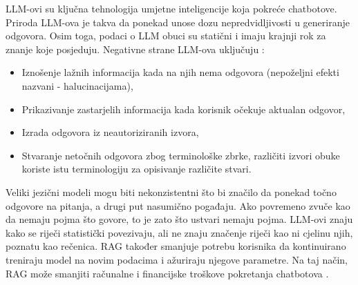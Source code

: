 \documentclass[]{foi}
\begin{document}
LLM-ovi su ključna tehnologija umjetne inteligencije koja pokreće chatbotove. Priroda LLM-ova je takva da ponekad unose dozu nepredvidljivosti
u generiranje odgovora. Osim toga, podaci o LLM obuci su statični i imaju krajnji rok za znanje koje posjeduju. Negativne strane LLM-ova uključuju \cite{awsRAG2025}:

\begin{itemize}
    \item Iznošenje lažnih informacija kada na njih nema odgovora (nepoželjni efekti nazvani - halucinacijama), 
    \item Prikazivanje zastarjelih informacija kada korisnik očekuje aktualan odgovor,
    \item Izrada odgovora iz neautoriziranih izvora,
    \item Stvaranje netočnih odgovora zbog terminološke zbrke, različiti izvori obuke koriste istu terminologiju za opisivanje različite stvari.
\end{itemize}

Veliki jezični modeli mogu biti nekonzistentni što bi značilo da ponekad točno odgovore na pitanja, a drugi put nasumično pogađaju. Ako povremeno zvuče kao da nemaju pojma što govore, 
to je zato što ustvari nemaju pojma. LLM-ovi znaju kako se riječi statistički povezivaju, ali ne znaju značenje riječi kao ni cjelinu njih, poznatu kao rečenica. RAG također smanjuje potrebu 
korisnika da kontinuirano treniraju model na novim podacima i ažuriraju njegove parametre. Na taj način, RAG može smanjiti računalne i financijske troškove pokretanja chatbotova \cite{ibmRAG}.
\end{document}
